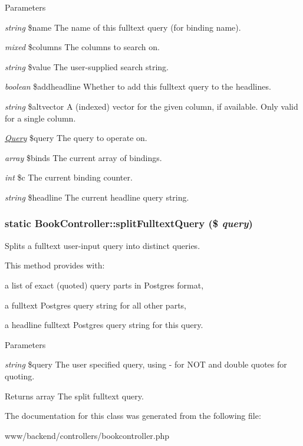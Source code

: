 \begin{DoxyParams}{Parameters}
\item[{\em string}]\$name The name of this fulltext query (for binding name). \item[{\em mixed}]\$columns The columns to search on. \item[{\em string}]\$value The user-\/supplied search string. \item[{\em boolean}]\$addheadline Whether to add this fulltext query to the headlines. \item[{\em string}]\$altvector A (indexed) vector for the given column, if available. Only valid for a single column. \item[{\em \hyperlink{classQuery}{Query}}]\$query The query to operate on. \item[{\em array}]\$binds The current array of bindings. \item[{\em int}]\$c The current binding counter. \item[{\em string}]\$headline The current headline query string. \end{DoxyParams}
\hypertarget{classBookController_adcf3d57be7a34444cb044754d5e11cb4}{
\subsubsection[{splitFulltextQuery}]{\setlength{\rightskip}{0pt plus 5cm}static BookController::splitFulltextQuery (\$ {\em query})}}
\label{classBookController_adcf3d57be7a34444cb044754d5e11cb4}
Splits a fulltext user-\/input query into distinct queries.

This method provides with:
\begin{DoxyItemize}
\item a list of exact (quoted) query parts in Postgres format,
\item a fulltext Postgres query string for all other parts,
\item a headline fulltext Postgres query string for this query.
\end{DoxyItemize}


\begin{DoxyParams}{Parameters}
\item[{\em string}]\$query The user specified query, using -\/ for NOT and double quotes for quoting.\end{DoxyParams}
\begin{DoxyReturn}{Returns}
array The split fulltext query. 
\end{DoxyReturn}


The documentation for this class was generated from the following file:\begin{DoxyCompactItemize}
\item 
www/backend/controllers/bookcontroller.php\end{DoxyCompactItemize}
